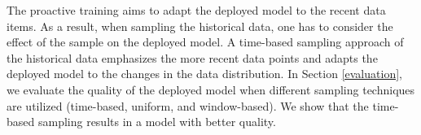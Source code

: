The proactive training aims to adapt the deployed model to the recent data items.
As a result, when sampling the historical data, one has to consider the effect of the sample on the deployed model.
A time-based sampling approach of the historical data emphasizes the more recent data points and adapts the deployed model to the changes in the data distribution.
In Section \ref{evaluation}, we evaluate the quality of the deployed model when different sampling techniques are utilized (time-based, uniform, and window-based).
We show that the time-based sampling results in a model with better quality.



